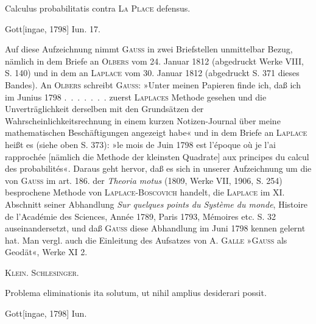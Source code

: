 \clearpage{}
\indent Calculus probabilitatis contra \textsc{La Place} defensus.
\par\noindent\hfill Gott[ingae, 1798] Iun. 17.

\medskip\begingroup\small
\indent Auf diese Aufzeichnung nimmt \textsc{Gauss} in zwei Briefstellen unmittelbar Bezug, nämlich in dem Briefe an \textsc{Olbers} vom 24. Januar 1812 (abgedruckt Werke VIII, S. 140) und in dem an \textsc{Laplace} vom 30. Januar 1812 (abgedruckt S. 371 dieses Bandes). An \textsc{Olbers} schreibt \textsc{Gauss}: »Unter meinen Papieren finde ich, daß ich im Junius 1798 .\ .\ .\ .\ .\ .\ . zuerst \textsc{Laplaces} Methode gesehen und die Unverträglichkeit derselben mit den Grundsätzen der Wahrscheinlichkeitsrechnung in einem kurzen Notizen-Journal über meine mathematischen Beschäftigungen angezeigt habe« und in dem Briefe an \textsc{Laplace} heißt es (siehe oben S. 373): »le mois de Juin 1798 est l’époque où je l’ai rapprochée [nämlich die Methode der kleinsten Quadrate] aux principes du calcul des probabilités«. Daraus geht hervor, daß es sich in unserer Aufzeichnung um die von \textsc{Gauss} im art. 186. der \textit{Theoria motus} (1809, Werke VII, 1906, S. 254) besprochene Methode von \textsc{Laplace-Boscovich} handelt, die \textsc{Laplace} im XI. Abschnitt seiner Abhandlung \textit{Sur quelques points du Système du monde}, Histoire de l’Académie des Sciences, Année 1789, Paris 1793, Mémoires etc. S. 32 auseinandersetzt, und daß \textsc{Gauss} diese Abhandlung im Juni 1798 kennen gelernt hat. Man vergl. auch die Einleitung des Aufsatzes von A. \textsc{Galle} »\textsc{Gauss} als Geodät«, Werke XI 2.
\par\noindent\hfill\textsc{Klein. Schlesinger.}
\par\endgroup

\indent Problema eliminationis ita solutum, ut nihil amplius desiderari possit.
\par\noindent\hfill Gott[ingae, 1798] Iun.

